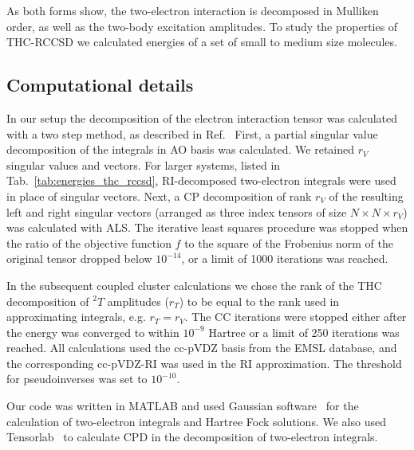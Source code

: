 As both forms show, the two-electron interaction is decomposed in Mulliken 
order, as well as the two-body excitation amplitudes. To study the 
properties of THC-RCCSD we calculated energies of a set of small to medium size 
molecules.

\subsection{Computational details}
In our setup the decomposition of the electron interaction tensor was 
calculated with a two step method, as described in 
Ref.~\cite{schutski2017tensor} First, a partial singular value decomposition of 
the integrals in AO basis was calculated. We retained $r_{V}$ singular values 
and vectors. For larger systems, listed in Tab.~\ref{tab:energies_thc_rccsd}, 
RI-decomposed two-electron integrals were used in place of singular 
vectors. Next, a CP decomposition of rank $r_{V}$ of the resulting 
left and right singular vectors (arranged as three index tensors of size $N 
\times N \times r_{V}$) was calculated with ALS. The iterative least squares 
procedure was stopped when the ratio of the objective function $f$ to the 
square of the Frobenius norm of the original tensor dropped below $10^{-14}$, or 
a limit of 1000 iterations was reached.

In the subsequent coupled cluster calculations we chose the rank of the THC 
decomposition of ${}^2T$ amplitudes ($r_{T}$) to be equal to the rank 
used in approximating integrals, e.g. $r_{T} = r_{V}$. 
The CC iterations were stopped either after the energy was converged to within 
$10^{-9}$ Hartree or a limit of 250 iterations 
was reached. All calculations used the cc-pVDZ basis from the EMSL
database,\cite{schuchardt2007basis} and the corresponding cc-pVDZ-RI
was used in the RI approximation. The threshold for pseudoinverses was set to 
$10^{-10}$.

Our code was written in MATLAB and used Gaussian software~\cite{gaussian} 
for the calculation of two-electron integrals and Hartree Fock solutions. We 
also used Tensorlab~\cite{vervliettensorlab} to calculate CPD in the 
decomposition of two-electron integrals.

